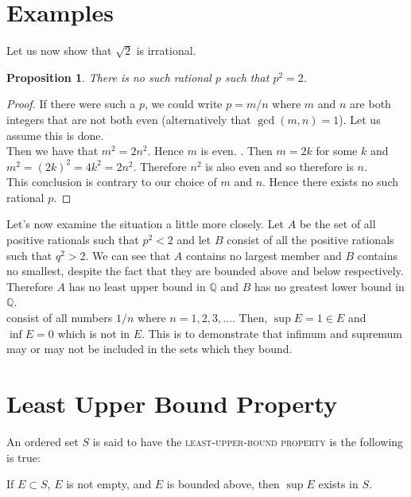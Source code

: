 \documentclass{tufte-book}
\newtheorem{proposition}{Proposition}[chapter]
\theoremstyle{definition}
\numberwithin{section}{chapter}
\begin{document}
\section{Examples}
Let us now show that $\sqrt{2}$ is irrational.

\begin{proposition} There is no such rational $p$ such that $p^2 = 2$. \end{proposition}

\begin{proof}  If there were such a $p$, we could write $p=m/n$ where $m$ and $n$ are both integers that are not both even (alternatively that $\gcd(m,n) = 1$).  Let us assume this is done.\\
Then we have that $m^2 = 2n^2$.  Hence $m$ is even. .  Then $m=2k$ for some $k$ and $m^2 = (2k)^2 = 4k^2 = 2n^2$.  Therefore $n^2$ is also even and so therefore is $n$.\\
This conclusion is contrary to our choice of $m$ and $n$.  Hence there exists no such rational $p$. \end{proof}

Let's now examine the situation a little more closely.   Let $A$ be the set of all positive rationals such that $p^2 < 2$ and let $B$ consist of all the positive rationals such that $q^2 > 2$.  We can see that $A$ contains no largest member and $B$ contains no smallest, despite the fact that they are bounded above and below respectively.  Therefore $A$ has no least upper bound in $\mathbb{Q}$ and $B$ has no greatest lower bound in $\mathbb{Q}$.  \\

 consist of all numbers $1/n$ where $n=1,2,3,\ldots$.  Then, $\sup E = 1 \in E$ and $\inf E =0$ which is not in $E$.  This is to demonstrate that infimum and supremum may or may not be included in the sets which they bound.


\section{Least Upper Bound Property}\label{sec:figures-and-tables}
An ordered set $S$ is said to have the \textsc{least-upper-bound property} is the following is true:

\begin{fullwidth}
If $E \subset S$, $E$ is not empty, and $E$ is bounded above, then $\sup E $ exists in $S$.
\end{fullwidth}
\end{document}
